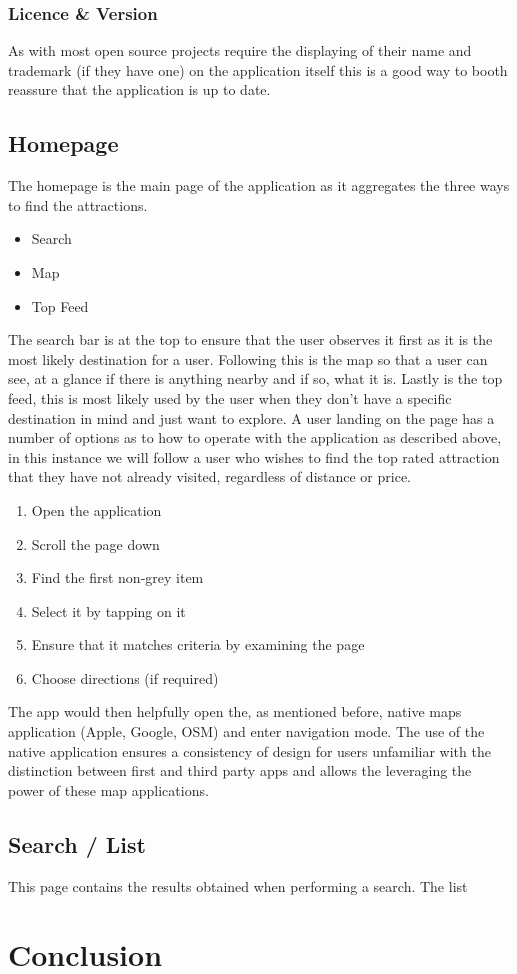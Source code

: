 \documentclass{article}
\begin{document}
\subsubsection{Licence & Version}
As with most open source projects require the displaying of their name and trademark (if they have one) on the application itself this is a good way to booth reassure that the application is up to date.
\subsection{Homepage}
The homepage is the main page of the application as it aggregates the three ways to find the attractions.
\begin{itemize}
	\item Search
	\item Map
	\item Top Feed
\end{itemize}
The search bar is at the top to ensure that the user observes it first as it is the most likely destination for a user.
Following this is the map so that a user can see, at a glance if there is anything nearby and if so, what it is.
Lastly is the top feed, this is most likely used by the user when they don't have a specific destination in mind and just want to explore.
A user landing on the page has a number of options as to how to operate with the application as described above, in this instance we will follow a user who wishes to find the top rated attraction that they have not already visited, regardless of distance or price.
\begin{enumerate}
	\item Open the application
	\item Scroll the page down
	\item Find the first non-grey item
	\item Select it by tapping on it
	\item Ensure that it matches criteria by examining the page
	\item Choose directions (if required)
\end{enumerate}
The app would then helpfully open the, as mentioned before, native maps application (Apple, Google, OSM) and enter navigation mode.
The use of the native application ensures a consistency of design for users unfamiliar with the distinction between first and third party apps and allows the leveraging the power of these map applications.
\subsection{Search / List}
This page contains the results obtained when performing a search.
The list
\section{Conclusion}
\end{document}
